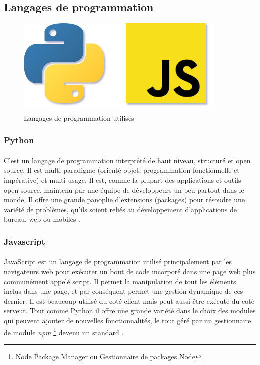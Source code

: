 	\subsection{Langages de programmation}
		\begin{figure}[H] 
		\centering
		\includegraphics[width=0.3\linewidth]{images/implementation/langs.png}
		\caption{Langages de programmation utilisés}
		\label{fig:langs}
	\end{figure}
		\subsubsection*{Python}
		\label{python}
		\paragraph{}
		 C'est un langage de programmation interprété de haut niveau, structuré et open source. Il est multi-paradigme (orienté objet, programmation fonctionnelle et impérative) et multi-usage. Il est, comme la plupart des applications et outils open source, maintenu par une équipe de développeurs un peu partout dans le monde. Il offre une grande panoplie d'extensions (packages) pour résoudre une variété de problèmes, qu'ils soient reliés au développement d'applications de bureau, web ou mobiles \cite{python}.
		
		\subsubsection*{Javascript} 
		\paragraph{}
		JavaScript est un langage de programmation utilisé principalement par les navigateurs web pour exécuter un bout de code incorporé dans une page web plus communément appelé script. Il permet la manipulation de tout les éléments inclus dans une page, et par conséquent permet une gestion dynamique de ces dernier. Il est beaucoup utilisé du coté client mais peut aussi être exécuté du coté serveur. Tout comme Python il offre une grande variété dans le choix des modules qui peuvent ajouter de nouvelles fonctionnalités, le tout géré par un gestionnaire de module \textit{npm} \footnote{Node Package Manager ou Gestionnaire de packages Node} devenu un standard \cite{js}.
	
